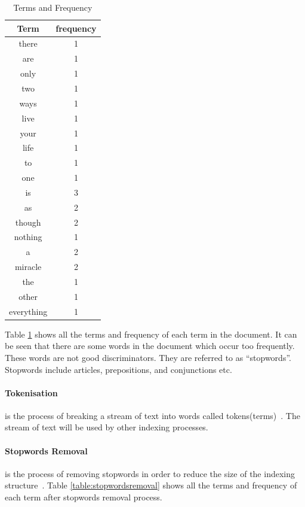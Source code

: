 \begin{table}
\centering
\begin{tabular}{|c|c|}

\hline \textbf{Term} & \textbf{frequency} \\
\hline there & 1 \\
\hline are & 1 \\
\hline only & 1 \\ 
\hline two & 1 \\
\hline ways & 1 \\
\hline live & 1 \\
\hline your & 1 \\
\hline life & 1 \\
\hline to & 1 \\
\hline one & 1 \\
\hline is & 3 \\
\hline as & 2 \\
\hline though & 2 \\
\hline nothing & 1 \\
\hline a & 2 \\
\hline miracle & 2 \\
\hline the & 1 \\
\hline other & 1 \\
\hline everything & 1 \\  
\hline
\end{tabular}
\caption{Terms and Frequency} \label{table:termsandfrequency}
\end{table}

Table \ref{table:termsandfrequency} shows all the terms and frequency of each term in the document. It can be seen that there are some words in the 
document which occur too frequently. These words are not good discriminators. They are referred to as ``stopwords''. Stopwords include
articles, prepositions, and conjunctions etc.

\paragraph{Tokenisation}
is the process of breaking a stream of text into words called tokens(terms)~\cite{tokenization}. The stream of text will be used by other indexing processes.

\paragraph{Stopwords Removal}
is the process of removing stopwords in order to reduce the size of the indexing structure~\cite[P. 15]{IRarchitecture}.
Table \ref{table:stopwordsremoval} shows all the terms and frequency of each term after stopwords removal process.

